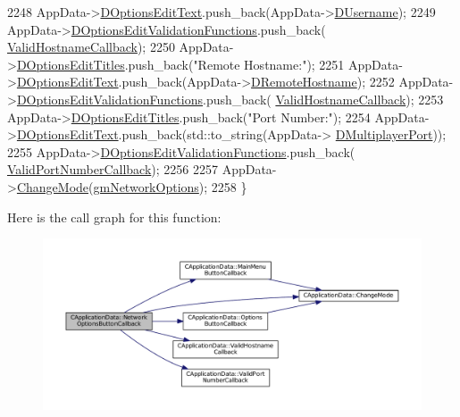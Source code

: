 \begin{DoxyCode}
2248     AppData->\hyperlink{classCApplicationData_a7044dc34cbd9d6776e8ef79eb12b5ce4}{DOptionsEditText}.push\_back(AppData->\hyperlink{classCApplicationData_aedfdb512317e5b62d0bbbcddcd48dfb8}{DUsername});
2249     AppData->\hyperlink{classCApplicationData_ab76fa444142de66fdb058f390e01112c}{DOptionsEditValidationFunctions}.push\_back(
      \hyperlink{classCApplicationData_aad04c7da1cc86bef623efda1019907fd}{ValidHostnameCallback});
2250     AppData->\hyperlink{classCApplicationData_a7a322ef6b8c1db3e995c6b493230fd05}{DOptionsEditTitles}.push\_back(\textcolor{stringliteral}{"Remote Hostname:"});
2251     AppData->\hyperlink{classCApplicationData_a7044dc34cbd9d6776e8ef79eb12b5ce4}{DOptionsEditText}.push\_back(AppData->\hyperlink{classCApplicationData_a09da79011ab5ce6d6108d1c20f0e7c69}{DRemoteHostname});
2252     AppData->\hyperlink{classCApplicationData_ab76fa444142de66fdb058f390e01112c}{DOptionsEditValidationFunctions}.push\_back(
      \hyperlink{classCApplicationData_aad04c7da1cc86bef623efda1019907fd}{ValidHostnameCallback});
2253     AppData->\hyperlink{classCApplicationData_a7a322ef6b8c1db3e995c6b493230fd05}{DOptionsEditTitles}.push\_back(\textcolor{stringliteral}{"Port Number:"});
2254     AppData->\hyperlink{classCApplicationData_a7044dc34cbd9d6776e8ef79eb12b5ce4}{DOptionsEditText}.push\_back(std::to\_string(AppData->
      \hyperlink{classCApplicationData_a99bed2c18513304de1cf2a2344bf091f}{DMultiplayerPort}));
2255     AppData->\hyperlink{classCApplicationData_ab76fa444142de66fdb058f390e01112c}{DOptionsEditValidationFunctions}.push\_back(
      \hyperlink{classCApplicationData_adc8125cc7c4ad01bdd43e6550c6ba133}{ValidPortNumberCallback});
2256 
2257     AppData->\hyperlink{classCApplicationData_aee18c113e9a0acb3cad3d63eb19de71b}{ChangeMode}(\hyperlink{classCApplicationData_ac8ac37a4c8bb871036fbbdc6a072e403a464109af3d31201d5dc8966512afd480}{gmNetworkOptions});
2258 \}
\end{DoxyCode}
Here is the call graph for this function\+:\nopagebreak
\begin{figure}[H]
\begin{center}
\leavevmode
\includegraphics[width=350pt]{classCApplicationData_ad41dbc2f54ee638aa64a1d0c22b3fba9_cgraph}
\end{center}
\end{figure}
